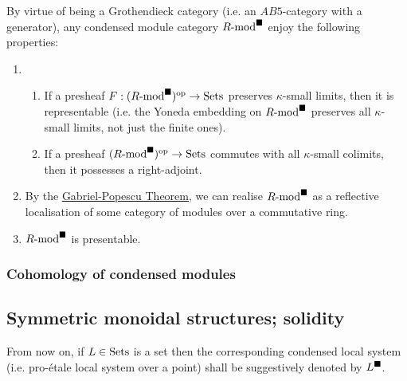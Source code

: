                 \begin{corollary} \label{coro: condensed_modules_properties}
                    By virtue of being a Grothendieck category (i.e. an $AB5$-category with a generator), any condensed module category $R\text{-}\mathrm{mod}^{\blacksquare}$ enjoy the following properties:
                        \begin{enumerate}
                            \item 
                                \begin{enumerate}
                                    \item If a presheaf $F: (R\text{-}\mathrm{mod}^{\blacksquare})^{\mathrm{op}} \to \mathrm{Sets}$ preserves $\kappa$-small limits, then it is representable (i.e. the Yoneda embedding on $R\text{-}\mathrm{mod}^{\blacksquare}$ preserves all $\kappa$-small limits, not just the finite ones).
                                    \item If a presheaf $(R\text{-}\mathrm{mod}^{\blacksquare})^{\mathrm{op}} \to \mathrm{Sets}$ commutes with all $\kappa$-small colimits, then it possesses a right-adjoint. 
                                \end{enumerate}
                            \item By the \href{https://ncatlab.org/nlab/show/Gabriel-Popescu+theorem}{\underline{Gabriel-Popescu Theorem}}, we can realise $R\text{-}\mathrm{mod}^{\blacksquare}$ as a reflective localisation of some category of modules over a commutative ring. 
                            \item $R\text{-}\mathrm{mod}^{\blacksquare}$ is presentable. 
                        \end{enumerate}
                \end{corollary}
                
            \subsubsection{Cohomology of condensed modules}
            
        \subsection{Symmetric monoidal structures; solidity}
            \begin{convention}
                From now on, if $L \in \mathrm{Sets}$ is a set then the corresponding condensed local system (i.e. pro-\'etale local system over a point) shall be suggestively denoted by $L^{\blacksquare}$.
            \end{convention}
        
